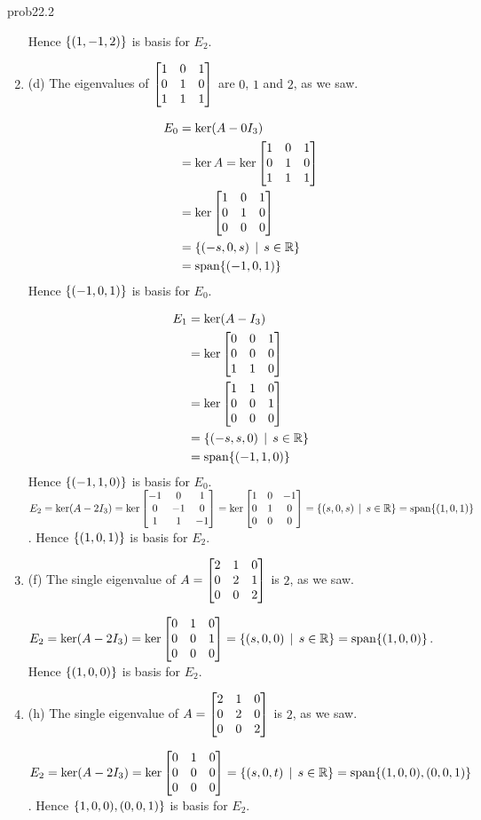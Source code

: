 \begin{sol}{prob22.2}
\begin{enumerate}[]
 Hence $\{(1,-1,2) \} $ is basis for $E_2$.
\medskip
\item (d) The eigenvalues of $\bmatrix 
1&0&1\\0&1&0\\1&1&1 \endbmatrix $ are $0$, $1$ and $2$, as we saw. 

\begin{align*}
E_0&=\ker(A-0I_3)\\
&=\ker A=\ker\bmatrix 
1&0&1\\0&1&0\\1&1&1 \endbmatrix\\
& =\ker \bmatrix 
 1 & 0 & 1 \\
 0 & 1 & 0 \\
 0 & 0 & 0 \endbmatrix \\
&=\set{(-s,0,s)\st s\in \R}\\
&=\spn\{(-1,0,1)\} \end{align*} Hence $\{(-1,0,1) \} $ is basis for $E_0$.

\smallskip
\begin{align*}
E_1&=\ker(A-I_3)\\ 
&=\ker\bmatrix 
0&0&1\\0&0&0\\1&1&0 \endbmatrix \\
&=\ker \bmatrix 
 1 & 1 & 0 \\
 0 & 0 & 1 \\
 0 & 0 & 0 \endbmatrix \\
&=\set{(-s,s,0)\st s\in \R}\\
&=\spn\{(-1,1,0)\} \end{align*} Hence $\{(-1,1,0) \} $ is basis for $E_0$.
\smallskip
$E_2=\ker(A-2I_3) =\ker\bmatrix 
-1&0&1\\0&-1&0\\1&1&-1 \endbmatrix  =\ker \bmatrix 
 1 & 0 & -1 \\
 0 & 1 & 0 \\
 0 & 0 & 0  \endbmatrix =\set{(s,0,s)\st s\in \R}=\spn\{(1,0,1)\} $. Hence $\{(1,0,1) \} $ is basis for $E_2$.
\medskip
\item (f)  The single eigenvalue of $A=\bmatrix 
2&1&0\\0&2&1\\0&0&2 \endbmatrix $ is $2$, as we saw.
\smallskip

$E_2=\ker(A-2I_3)=\ker\bmatrix 
0&1&0\\0&0&1\\0&0&0\endbmatrix    =\set{(s,0,0)\st s\in \R}=\spn\{(1,0,0)\} $. Hence $\{(1,0,0) \} $ is basis for $E_2$.
\medskip
\item (h)  The single eigenvalue of $A=\bmatrix 
2&1&0\\0&2&0\\0&0&2 \endbmatrix $ is $2$, as we saw.
\smallskip

$E_2=\ker(A-2I_3)=\ker\bmatrix 
0&1&0\\0&0&0\\0&0&0\endbmatrix    =\set{(s,0,t)\st s\in \R}=\spn\{(1,0,0), (0,0,1)\} $. Hence $\{1,0,0), (0,0,1) \} $ is basis for $E_2$.
\medskip
\end{enumerate}

\end{sol}

